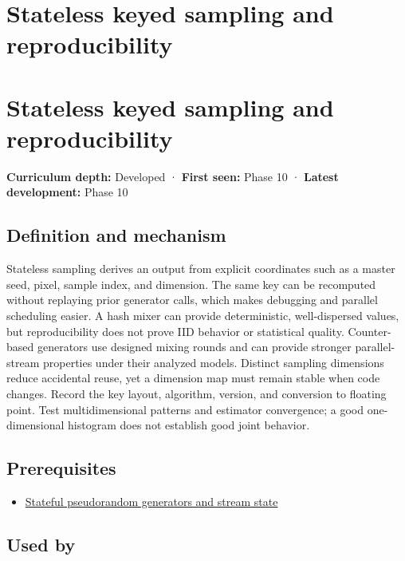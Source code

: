 \hypertarget{appendix-daaf25bfd3a0}{}
\section*{Stateless keyed sampling and reproducibility}
\section{Stateless keyed sampling and reproducibility}\label{appendix-daaf25bfd3a0-stateless-keyed-sampling-and-reproducibility}

\textbf{Curriculum depth:} Developed · \textbf{First seen:} Phase 10 · \textbf{Latest development:} Phase 10

\subsection{Definition and mechanism}\label{appendix-daaf25bfd3a0-definition-and-mechanism}

Stateless sampling derives an output from explicit coordinates such as a master seed, pixel, sample index, and dimension. The same key can be recomputed without replaying prior generator calls, which makes debugging and parallel scheduling easier. A hash mixer can provide deterministic, well-dispersed values, but reproducibility does not prove IID behavior or statistical quality. Counter-based generators use designed mixing rounds and can provide stronger parallel-stream properties under their analyzed models. Distinct sampling dimensions reduce accidental reuse, yet a dimension map must remain stable when code changes. Record the key layout, algorithm, version, and conversion to floating point. Test multidimensional patterns and estimator convergence; a good one-dimensional histogram does not establish good joint behavior.

\subsection{Prerequisites}\label{appendix-daaf25bfd3a0-prerequisites}

\begin{itemize}
\tightlist
\item
  \hyperref[appendix-e0f7c7e08f3a]{Stateful pseudorandom generators and stream state}
\end{itemize}

\subsection{Used by}\label{appendix-daaf25bfd3a0-used-by}

